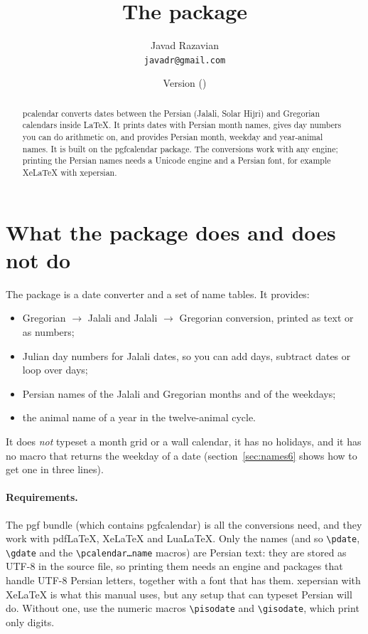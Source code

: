 \documentclass[11pt]{article}
\title{The \pkg{pcalendar} package}
\author{Javad Razavian\\\texttt{javadr@gmail.com}}
\date{Version \pcalendarversion\quad(\pcalendardate)}
\newcommand\pkg[1]{\textsf{#1}}
\newcommand\cs[1]{\texttt{\textbackslash #1}}
\begin{document}
\latin %

\maketitle

\begin{abstract}\noindent
\pkg{pcalendar} converts dates between the Persian (Jalali, Solar Hijri) and Gregorian calendars
inside \LaTeX{}. It prints dates with Persian month names, gives day numbers you can do arithmetic
on, and provides Persian month, weekday and year-animal names. It is built on the \pkg{pgfcalendar}
package. The conversions work with any engine; printing the Persian names needs a Unicode
engine and a Persian font, for example XeLaTeX with \pkg{xepersian}.
\end{abstract}

\tableofcontents

\section{What the package does and does not do}\label{sec:what1}

The package is a date converter and a set of name tables. It provides:
\begin{itemize}
  \item Gregorian $\to$ Jalali and Jalali $\to$ Gregorian conversion, printed as text or as numbers;
  \item Julian day numbers for Jalali dates, so you can add days, subtract dates or loop over days;
  \item Persian names of the Jalali and Gregorian months and of the weekdays;
  \item the animal name of a year in the twelve-animal cycle.
\end{itemize}
It does \emph{not} typeset a month grid or a wall calendar, it has no holidays, and it has no macro
that returns the weekday of a date (section~\ref{sec:names6} shows how to get one in three lines).

\paragraph{Requirements.} The \pkg{pgf} bundle (which contains \pkg{pgfcalendar}) is all the
conversions need, and they work with pdf\LaTeX{}, Xe\LaTeX{} and Lua\LaTeX{}. Only the names (and
so \cs{pdate}, \cs{gdate} and the \texttt{\textbackslash pcalendar\ldots name} macros) are Persian
text: they are stored as UTF-8 in the source file, so printing them needs an engine and packages that
handle UTF-8 Persian letters, together with a font that has them. \pkg{xepersian} with Xe\LaTeX{} is
what this manual uses, but any setup that can typeset Persian will do. Without one, use the numeric
macros \cs{pisodate} and \cs{gisodate}, which print only digits.
\end{document}
